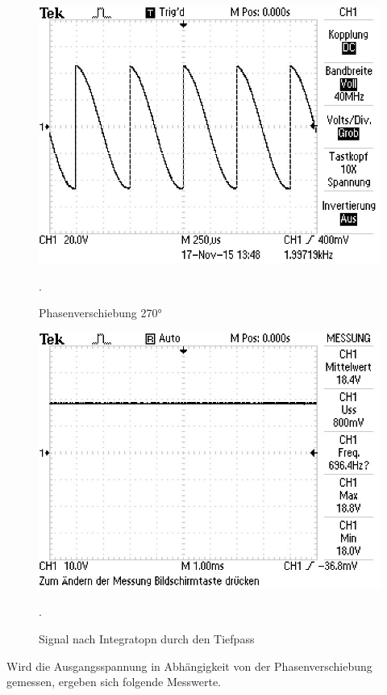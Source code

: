 \begin{figure}
  \centering
  \includegraphics[width=\textwidth]{bilder/Ohne Rauschen/5.JPG}
  \caption{Phasenverschiebung 270°}.
  \label{fig:bild5}
\end{figure}

\begin{figure}
  \centering
  \includegraphics[width=\textwidth]{bilder/Ohne Rauschen/6.JPG}
  \caption{Signal nach Integratopn durch den Tiefpass}.
  \label{fig:bild6}
\end{figure}

Wird die Ausgangsspannung in Abhängigkeit von der Phasenverschiebung gemessen, ergeben sich folgende Messwerte.

